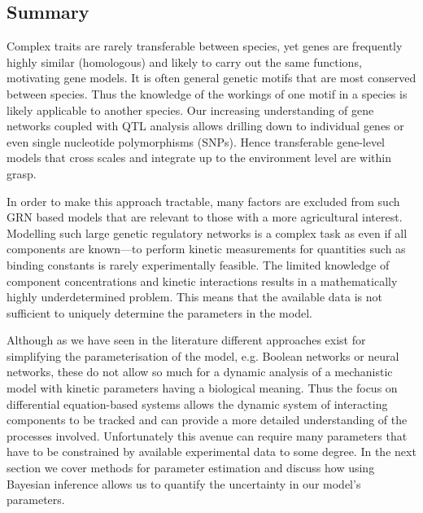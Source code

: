 \subsection{Summary}
Complex traits are rarely transferable between species, yet genes are frequently highly similar (homologous) and likely to carry out the same functions, motivating gene models.
It is often general genetic motifs that are most conserved between species.
Thus the knowledge of the workings of one motif in a species is likely applicable to another species.
Our increasing understanding of gene networks coupled with QTL analysis allows drilling down to individual genes or even single nucleotide polymorphisms (SNPs).
Hence transferable gene-level models that cross scales and integrate up to the environment level are within grasp. 

In order to make this approach tractable, many factors are excluded from such GRN based models that are relevant to those with a more agricultural interest. 
Modelling such large genetic regulatory networks is a complex task as even if all components are known---to perform kinetic measurements for quantities such as binding constants is rarely experimentally feasible.
The limited knowledge of component concentrations and kinetic interactions results in a mathematically highly underdetermined problem.
This means that the available data is not sufficient to uniquely determine the parameters in the model.

Although as we have seen in the literature different approaches exist for simplifying the parameterisation of the model, e.g. Boolean networks or neural networks, these do not allow so much for a dynamic analysis of a mechanistic model with kinetic parameters having a biological meaning.
Thus the focus on differential equation-based systems allows the dynamic system of interacting components to be tracked and can provide a more detailed understanding of the processes involved.
Unfortunately this avenue can require many parameters that have to be constrained by available experimental data to some degree.
In the next section we cover methods for parameter estimation and discuss how using Bayesian inference allows us to quantify the uncertainty in our model's parameters.

